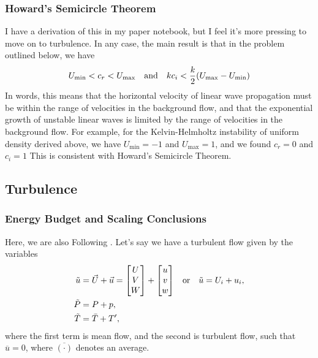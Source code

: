 \documentclass[10pt]{article}
\begin{document}
\subsubsection{Howard's Semicircle Theorem}
I have a derivation of this in my paper notebook, but I feel it's more pressing to move on to turbulence. In any case, the main result is that in the problem outlined below, we have
\begin{align}
    U_{\mathrm{min}} < c_r < U_{\mathrm{max}} \qq{and} kc_i < \frac{k}{2}(U_{\mathrm{max}} - U_{\mathrm{min}})
\end{align}
In words, this means that the horizontal velocity of linear wave propagation must be within the range of velocities in the background flow, and that the exponential growth of unstable linear waves is limited by the range of velocities in the background flow. For example, for the Kelvin-Helmholtz instability of uniform density derived above, we have $U_{\mathrm{min}} = -1$ and $U_{\mathrm{max}} = 1$, and we found $c_r = 0$ and $c_i = 1$ This is consistent with Howard's Semicircle Theorem.

\subsection{Turbulence}

\subsubsection{Energy Budget and Scaling Conclusions}
Here, we are also Following \citet{kundu2004}.
Let's say we have a turbulent flow given by the variables
\begin{align}
    \tilde{u} & = \vec{U} + \vec{u} = \mqty[U\\V\\W] + \mqty[u\\v\\w] \qq{or} \tilde{u} = U_i + u_i, \\
    \tilde{P} & = P + p, \\
    \tilde{T} & = \bar{T} + T',
\end{align}
where the first term is mean flow, and the second is turbulent flow, such that $\overline{u} = 0$, where $\overline{(\cdot)}$ denotes an average.
\end{document}
